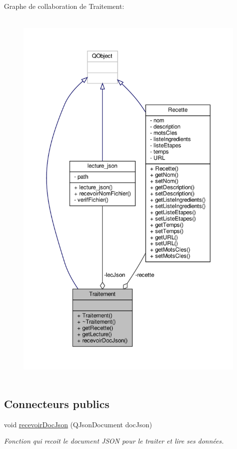 Graphe de collaboration de Traitement\+:\nopagebreak
\begin{figure}[H]
\begin{center}
\leavevmode
\includegraphics[height=550pt]{classTraitement__coll__graph}
\end{center}
\end{figure}
\subsection*{Connecteurs publics}
\begin{DoxyCompactItemize}
\item 
void \hyperlink{classTraitement_a7bbc7e2034b55a9de14c010be7d3de11}{recevoir\+Doc\+Json} (Q\+Json\+Document doc\+Json)
\begin{DoxyCompactList}\small\item\em Fonction qui recoit le document J\+S\+ON pour le traiter et lire ses données. \end{DoxyCompactList}\end{DoxyCompactItemize}
